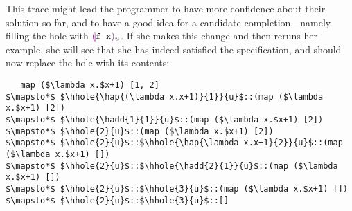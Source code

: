 This trace might lead the programmer to have more confidence about their
solution so far, and to have a good idea for a candidate
completion---namely filling the hole with $\textcolor{violet}{\llparenthesis}\texttt{f x}\textcolor{violet}{\rrparenthesis}_{u}$. If she
makes this change and then reruns her example, she will see that she has
indeed satisfied the specification, and should now replace the hole with
its contents:
\begin{lstlisting}
   map ($\lambda x.$x+1) [1, 2]
$\mapsto*$ $\hhole{\hap{(\lambda x.x+1)}{1}}{u}$::(map ($\lambda x.$x+1) [2])
$\mapsto*$ $\hhole{\hadd{1}{1}}{u}$::(map ($\lambda x.$x+1) [2])
$\mapsto*$ $\hhole{2}{u}$::(map ($\lambda x.$x+1) [2])
$\mapsto*$ $\hhole{2}{u}$::$\hhole{\hap{\lambda x.x+1}{2}}{u}$::(map ($\lambda x.$x+1) [])
$\mapsto*$ $\hhole{2}{u}$::$\hhole{\hadd{2}{1}}{u}$::(map ($\lambda x.$x+1) [])
$\mapsto*$ $\hhole{2}{u}$::$\hhole{3}{u}$::(map ($\lambda x.$x+1) [])
$\mapsto*$ $\hhole{2}{u}$::$\hhole{3}{u}$::[]
\end{lstlisting}
